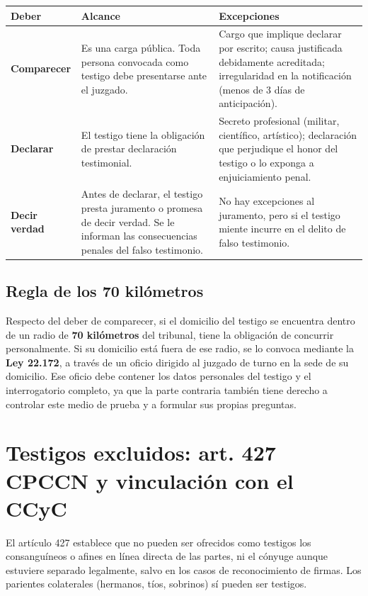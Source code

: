 \documentclass[12pt,oneside]{book}
\renewcommand{\arraystretch}{1.15}
\begin{document}
\begin{center}
\renewcommand{\arraystretch}{1.3}
\begin{tabularx}{\textwidth}{
    >{\raggedright\arraybackslash}p{}
    >{\raggedright\arraybackslash}X
    >{\raggedright\arraybackslash}X}
\toprule
\textbf{Deber} & \textbf{Alcance} & \textbf{Excepciones} \\
\midrule
\textbf{Comparecer} & Es una carga pública. Toda persona convocada como testigo debe presentarse ante el juzgado. & Cargo que implique declarar por escrito; causa justificada debidamente acreditada; irregularidad en la notificación (menos de 3 días de anticipación). \\
\addlinespace
\textbf{Declarar} & El testigo tiene la obligación de prestar declaración testimonial. & Secreto profesional (militar, científico, artístico); declaración que perjudique el honor del testigo o lo exponga a enjuiciamiento penal. \\
\addlinespace
\textbf{Decir verdad} & Antes de declarar, el testigo presta juramento o promesa de decir verdad. Se le informan las consecuencias penales del falso testimonio. & No hay excepciones al juramento, pero si el testigo miente incurre en el delito de falso testimonio. \\
\bottomrule
\end{tabularx}
\end{center}

\subsection*{Regla de los 70 kilómetros}

Respecto del deber de comparecer, si el domicilio del testigo se encuentra dentro de un radio de \textbf{70 kilómetros} del tribunal, tiene la obligación de concurrir personalmente. Si su domicilio está fuera de ese radio, se lo convoca mediante la \textbf{Ley 22.172}, a través de un oficio dirigido al juzgado de turno en la sede de su domicilio. Ese oficio debe contener los datos personales del testigo y el interrogatorio completo, ya que la parte contraria también tiene derecho a controlar este medio de prueba y a formular sus propias preguntas.

\section{Testigos excluidos: art. 427 CPCCN y vinculación con el CCyC}

El artículo 427 establece que no pueden ser ofrecidos como testigos los consanguíneos o afines en línea directa de las partes, ni el cónyuge aunque estuviere separado legalmente, salvo en los casos de reconocimiento de firmas. Los parientes colaterales (hermanos, tíos, sobrinos) sí pueden ser testigos.
\end{document}
